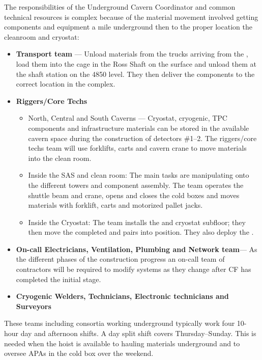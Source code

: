 The responsibilities of the Underground Cavern Coordinator and common
technical resources is complex because of the material movement
involved getting components and equipment a mile underground then to
the proper location the cleanroom and cryostat:
\begin{itemize}
  \item {\bf Transport team} --- Unload materials from the trucks arriving
    from the , load them into the cage in the Ross Shaft on the
    surface and unload them at the shaft station on the 4850 level.
    They then deliver the components to the correct location in the
     complex.
  \item {\bf {} Riggers/Core Techs}
    \begin{itemize}
      \item North, Central and South Caverns --- Cryostat, cryogenic,
        TPC components and infrastructure materials can be stored in
        the available cavern space during the construction of
        detectors \#1--2.  The  riggers/core techs team will use
        forklifts, carts and cavern crane to move materials into the
        clean room.
      \item Inside the SAS and clean room: The main tasks are
        manipulating  onto the different 
        towers and  component assembly. The team operates
        the shuttle beam and crane, opens and closes the cold boxes
        and moves materials with forklift, carts and motorized pallet
        jacks.
      \item Inside the Cryostat: The  team installs the
         and cryostat subfloor; they then move the
        completed  and  pairs into
        position. They also deploy the .
    \end{itemize}
  \item {\bf On-call Electricians, Ventilation, Plumbing and Network
    team}--- As the different phases of the 
    construction progress an on-call team of contractors will be
    required to modify systems as they change after CF has completed
    the initial stage.
   \item {\bf Cryogenic Welders, Technicians, Electronic technicians and Surveyors}
\end{itemize}

These teams including consortia working underground typically work
four 10-hour day and afternoon shifts.  A day split shift covers
Thursday--Sunday. This is needed when the hoist is available to hauling
materials underground and to oversee APAs in the cold box over the
weekend.

